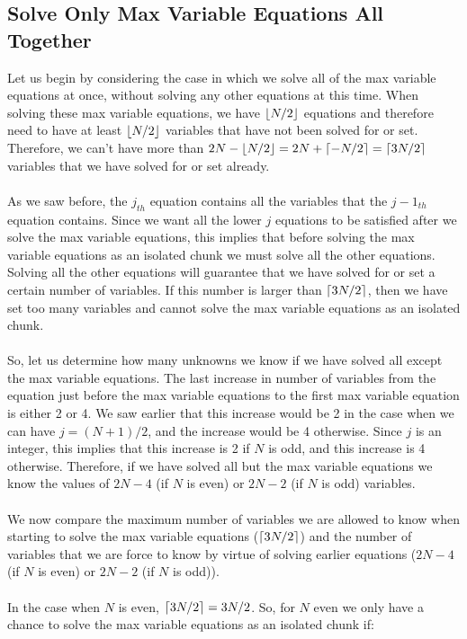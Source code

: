 \documentclass[a4paper]{article}
\DeclarePairedDelimiter{\ceil}{\lceil}{\rceil}
\DeclarePairedDelimiter\floor{\lfloor}{\rfloor}
\begin{document}
\subsection*{Solve Only Max Variable Equations All Together}
Let us begin by considering the case in which we solve all of the max variable equations at once, without solving any other equations at this time. When solving these max variable equations, we have $\floor{N/2}$ equations and therefore need to have at least $\floor{N/2}$ variables that have not been solved for or set. Therefore, we can't have more than $2N - \floor{N/2} = 2N + \ceil{-N/2} = \ceil{3N/2}$ variables that we have solved for or set already.
\\\\
As we saw before, the $j_{th}$ equation contains all the variables that the $j-1_{th}$ equation contains. Since we want all the lower $j$ equations to be satisfied after we solve the max variable equations, this implies that before solving the max variable equations as an isolated chunk we must solve all the other equations. Solving all the other equations will guarantee that we have solved for or set a certain number of variables. If this number is larger than $\ceil{3N/2}$, then we have set too many variables and cannot solve the max variable equations as an isolated chunk.
\\\\
So, let us determine how many unknowns we know if we have solved all except the max variable equations. The last increase in number of variables from the equation just before the max variable equations to the first max variable equation is either 2 or 4. We saw earlier that this increase would be 2 in the case when we can have $j = (N+1)/2$, and the increase would be 4 otherwise. Since $j$ is an integer, this implies that this increase is 2 if $N$ is odd, and this increase is 4 otherwise. Therefore, if we have solved all but the max variable equations we know the values of $2N - 4$ (if $N$ is even) or $2N-2$ (if $N$ is odd) variables.
\\\\
We now compare the maximum number of variables we are allowed to know when starting to solve the max variable equations ($\ceil{3N/2}$) and the number of variables that we are force to know by virtue of solving earlier equations ($2N - 4$ (if $N$ is even) or $2N-2$ (if $N$ is odd)).
\\\\
In the case when $N$ is even, $\ceil{3N/2} = 3N/2$. So, for $N$ even we only have a chance to solve the max variable equations as an isolated chunk if:
\end{document}
